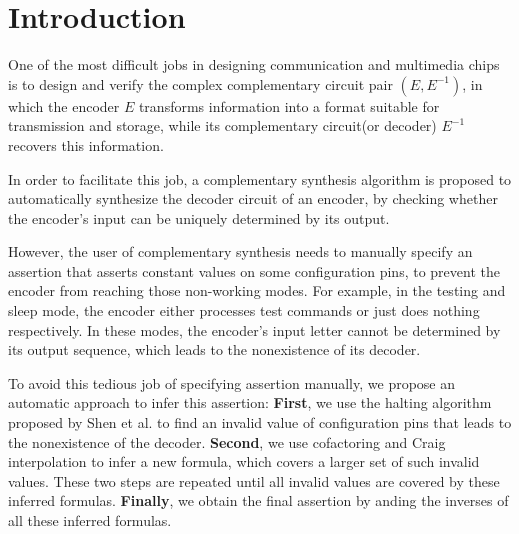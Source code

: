 \documentclass[journal]{IEEEtran}
\begin{document}
\newtheorem{definition11}{\textbf{Definition}}
\newtheorem{lemma}{\textbf{Lemma}}
\newtheorem{theorem}{\textbf{Theorem}}
\newtheorem{proposition}{\textbf{Proposition}}




%
\IEEEpeerreviewmaketitle



\section{Introduction}\label{sec_intro}

One of the most difficult jobs in designing communication and multimedia chips
is to design and verify the complex complementary circuit pair $(E,E^{-1})$,
in which the encoder $E$ transforms information into a format suitable for transmission and storage,
while its complementary circuit(or decoder) $E^{-1}$ recovers this information.

In order to facilitate this job,
a complementary synthesis algorithm\cite{ShengYuShen:iccad09,ShengYuShen:tcad} is proposed
to automatically synthesize the decoder circuit of an encoder,
by checking whether the encoder's input can be uniquely determined by its output.

However,
the user of complementary synthesis needs to manually specify an assertion that asserts constant values on some configuration pins,
to prevent the encoder from reaching those non-working modes.
For example, in the testing and sleep mode, the encoder either processes test commands or just does nothing respectively.
In these modes,
the encoder's input letter cannot be determined by its output sequence,
which leads to the nonexistence of its decoder.

To avoid this tedious job of specifying assertion manually,
we propose an automatic approach to infer this assertion:
\textbf{First},
we use the halting algorithm proposed by Shen et al. \cite{ShengYuShen:tcad11} to find an invalid value of configuration pins that leads to the nonexistence of the decoder.
\textbf{Second},
we use cofactoring\cite{Cofact} and Craig interpolation\cite{Craig} to infer a new formula,
which covers a larger set of such invalid values.
These two steps are repeated until all invalid values are covered by these inferred formulas.
\textbf{Finally},
we obtain the final assertion by anding the inverses of all these inferred formulas.
\end{document}
